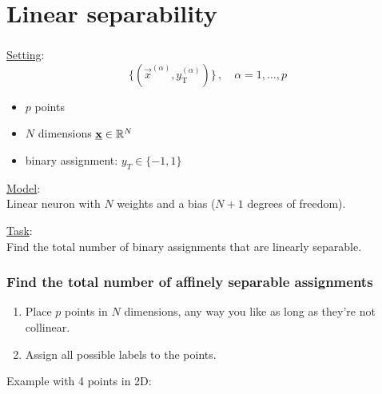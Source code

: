 \section{Linear separability}


\begin{frame}\frametitle{\secname}

\underline{Setting}:\\

\begin{equation*}
\Big\{ \left(\vec x^{(\alpha)}, y^{(\alpha)}_{\mathrm{T}} \right) \Big\}\,,\quad \alpha = 1,\ldots,p
\end{equation*}

\begin{itemize}
\item $p$ points
\item $N$ dimensions $\underline{\mathbf{x}} \in \mathbb{R}^N$
\item binary assignment: $y_T \in \{-1,1\}$
\end{itemize}

\pause

\underline{Model}:\\

Linear neuron with $N$ weights and a bias ($N+1$ degrees of freedom).

\pause

\underline{Task}:\\

Find the total number of binary assignments that are linearly separable.

\end{frame}

\begin{frame}\frametitle{Find the total number of affinely separable assignments}

\begin{enumerate}
\item Place $p$ points in $N$ dimensions, any way you like as long as they're not collinear.
\item Assign all possible labels to the points.
\end{enumerate}

Example with 4 points in 2D:


\\



\end{frame}

